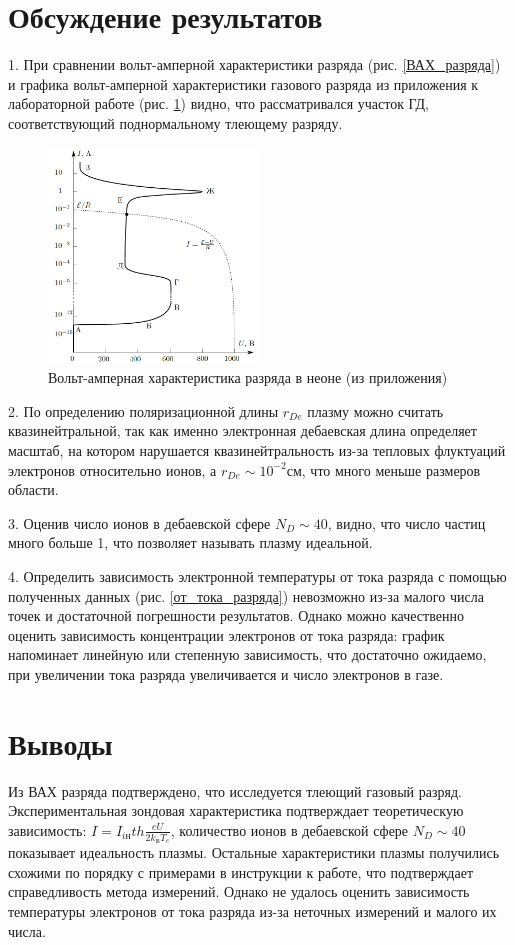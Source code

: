 \documentclass[a4paper,12pt]{article} %
\begin{document}
\section{Обсуждение результатов}


1.  При сравнении вольт-амперной характеристики разряда (рис. \ref{ВАХ_разряда}) и графика вольт-амперной характеристики газового разряда из приложения к лабораторной работе (рис. \ref{приложение}) видно, что рассматривался участок ГД, соответствующий поднормальному тлеющему разряду.

\begin{figure}[h!]
\begin{center}
\includegraphics[width=0.5\textwidth]{Приложение}
\caption{Вольт-амперная характеристика разряда в неоне (из приложения)} \label{приложение}
\end{center}
\end{figure}

2. По определению поляризационной длины $r_{De}$ плазму можно считать квазинейтральной, так как именно электронная дебаевская длина определяет масштаб, на котором нарушается квазинейтральность из-за тепловых флуктуаций электронов относительно ионов, а $r_{De} \sim 10^{-2} см$, что много меньше размеров области.

3. Оценив число ионов в дебаевской сфере $N_D \sim 40$, видно, что число частиц много больше 1, что позволяет называть плазму идеальной.

4. Определить зависимость электронной температуры от тока разряда с помощью полученных данных (рис. \ref{от_тока_разряда}) невозможно из-за малого числа точек и достаточной погрешности результатов. Однако можно качественно оценить зависимость концентрации электронов от тока разряда: график напоминает линейную или степенную зависимость, что достаточно ожидаемо, при увеличении тока разряда увеличивается и число электронов в газе.


\section{Выводы}
Из ВАХ разряда подтверждено, что исследуется тлеющий газовый разряд. 
Экспериментальная зондовая характеристика подтверждает теоретическую зависимость: $I = I_{iн} th\frac{eU}{2k_БT_e}$, количество ионов в дебаевской сфере $N_D \sim 40$ показывает идеальность плазмы. Остальные характеристики плазмы получились схожими по порядку с примерами в инструкции к работе, что подтверждает справедливость метода измерений. Однако не удалось оценить зависимость температуры электронов от тока разряда из-за неточных измерений и малого их числа.
\end{document}
